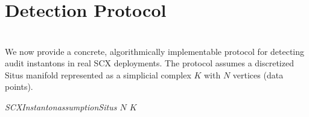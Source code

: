 \documentclass[11pt,a4paper]{article}
\theoremstyle{plain}
\theoremstyle{definition}
\begin{document}
\section{Detection Protocol}
\section*{}

We now provide a concrete, algorithmically implementable protocol for 
detecting audit instantons in real SCX deployments. The protocol assumes 
a discretized Situs manifold represented as a simplicial complex $K$ 
with $N$ vertices (data points).

\bigskip
\noindent
\textit{SCXInstantonassumptionSitus $N$  $K$ }
\end{document}
